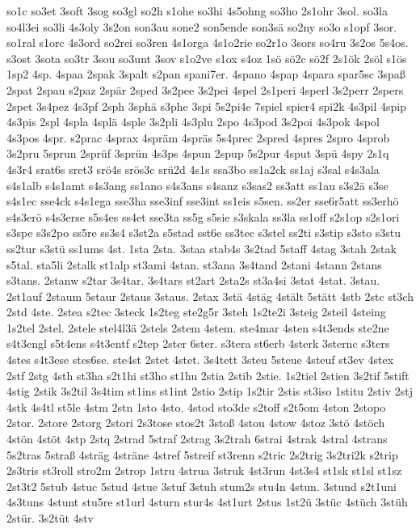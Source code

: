 {so1c
so3et
3soft
3sog
so3gl
so2h
s1ohe
so3hi
4s5ohng
so3ho
2s1ohr
3sol.
so3la
so4l3ei
so3li
4s3oly
3s2on
son3au
sone2
son5ende
son3sä
so2ny
so3o
s1opf
3sor.
so1ral
s1orc
4s3ord
so2rei
so3ren
4s1orga
4s1o2rie
so2r1o
3sors
so4ru
3s2os
5s4os.
s3ost
3sota
so3tr
3sou
so3unt
3sov
s1o2ve
s1ox
s4oz
1sö
sö2c
sö2f
2s1ök
2söl
s1ös
1sp2
4sp.
4spaa
2spak
3spalt
s2pan
spani7er.
4spano
4spap
4spara
spar5sc
3spaß
2spat
2spau
s2paz
2spär
2sped
3s2pee
3s2pei
4spel
2s1peri
4sperl
3s2perr
2spers
2spet
3s4pez
4s3pf
2sph
3sphä
s3phe
3spi
5s2pi4e
7spiel
spier4
spi2k
4s3pil
4spip
4s3pis
2spl
4spla
4splä
4sple
3s2pli
4s3plu
2spo
4s3pod
3s2poi
4s3pok
4spol
4s3pos
4spr.
s2prac
4sprax
4spräm
4spräs
5s4prec
2spred
4spres
2spro
4sprob
3s2pru
5sprun
2sprüf
3sprün
4s3ps
4spun
2spup
5s2pur
4sput
3spü
4spy
2s1q
4s3r4
srat6s
sret3
srö4s
srös3c
srü2d
4s1s
ssa3bo
ss1a2ck
ss1aj
s3sal
s4s3ala
s4s1alb
s4s1amt
s4s3ang
ss1ano
s4s3ans
s4sanz
s3sas2
ss3att
ss1au
s3s2ä
s3se
s4s1ec
sse4ck
s4s1ega
sse3ha
sse3inf
sse3int
ss1eis
s5sen.
ss2er
sse6r5att
ss3erhö
s4s3erö
s4s3erse
s5s4es
ss4et
sse3ta
ss5g
s5sie
s3skala
ss3la
ss1off
s2s1op
s2s1ori
s3spe
s3s2po
ss5re
ss3s4
s3st2a
s5stad
sst6e
ss3tec
s3stel
ss2ti
s3stip
s3sto
s3stu
ss2tur
s3stü
ss1ums
4st.
1sta
2sta.
3staa
stab4s
3s2tad
5staff
4stag
3stah
2stak
s5tal.
sta5li
2stalk
st1alp
st3ami
4stan.
st3ana
3s4tand
2stani
4stann
2stans
s3tans.
2stanw
s2tar
3s4tar.
3s4tars
st2art
2sta2s
st3a4si
3stat
4stat.
3stau.
2st1auf
2staum
5staur
2staus
3staus.
2stax
3stä
4stäg
4stält
5stätt
4stb
2stc
st3ch
2std
4ste.
2stea
s2tec
3steck
1s2teg
ste2g5r
3steh
1s2te2i
3steig
2steil
4steing
1s2tel
2stel.
2stele
stel4l3ä
2stels
2stem
4stem.
ste4mar
4sten
s4t3ends
ste2ne
s4t3engl
s5t4ens
s4t3entf
s2tep
2ster
6ster.
s3tera
st6erb
4sterk
3sternc
s3ters
4stes
s4t3ese
stes6se.
ste4st
2stet
4stet.
3s4tett
3steu
5steue
4steuf
st3ev
4stex
2stf
2stg
4sth
st3ha
s2t1hi
st3ho
st1hu
2stia
2stib
2stie.
1s2tiel
2stien
3s2tif
5stift
4stig
2stik
3s2til
3s4tim
st1ins
st1int
2stio
2stip
1s2tir
2stis
st3iso
1stitu
2stiv
2stj
4stk
4s4tl
st5le
4stm
2stn
1sto
4sto.
4stod
sto3de
s2toff
s2t5om
4ston
2stopo
2stor.
2store
2storg
2stori
2s3tose
stos2t
3stoß
4stou
4stow
4stoz
3stö
4stöch
4stön
4stöt
4stp
2stq
2strad
5straf
2strag
3s2trah
6strai
4strak
4stral
4strans
5s2tras
5straß
4sträg
4sträne
4stref
5streif
st3renn
s2tric
2s2trig
3s2tri2k
s2trip
2s3tris
st3roll
stro2m
2strop
1stru
4strua
3struk
4st3run
4st3s4
st1sk
st1sl
st1sz
2st3t2
5stub
4stuc
5stud
4stue
3stuf
3stuh
stum2s
stu4n
4stun.
3stund
s2t1uni
4s3tuns
4stunt
stu5re
st1url
4sturn
stur4s
4st1urt
2stus
1st2ü
3stüc
4stüch
3stüh
2stür.
3s2tüt
4stv
}
